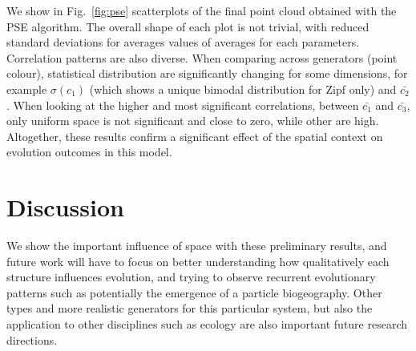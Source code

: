 \documentclass[letterpaper]{article}
\begin{document}
We show in Fig.~\ref{fig:pse} scatterplots of the final point cloud obtained with the PSE algorithm. The overall shape of each plot is not trivial, with reduced standard deviations for averages values of averages for each parameters. Correlation patterns are also diverse. When comparing across generators (point colour), statistical distribution are significantly changing for some dimensions, for example $\sigma(c_1)$ (which shows a unique bimodal distribution for Zipf only) and $\bar{c_2}$. When looking at the higher and most significant correlations, between $\bar{c_1}$ and $\bar{c_3}$, only uniform space is not significant and close to zero, while other are high.
Altogether, these results confirm a significant effect of the spatial context on evolution outcomes in this model.




\section{Discussion}


We show the important influence of space with these preliminary results, and future work will have to focus on better understanding how qualitatively each structure influences evolution, and trying to observe recurrent evolutionary patterns such as potentially the emergence of a particle biogeography. Other types and more realistic generators for this particular system, but also the application to other disciplines such as ecology are also important future research directions.

\footnotesize

\end{document}
